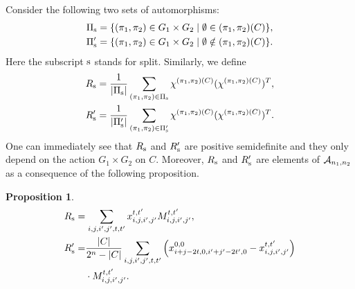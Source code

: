 \documentclass[final,onecolumn]{IEEEtran}
\newtheorem{propositionenv}[definitionenv]{Proposition}
\newenvironment{proposition}{\begin{propositionenv}\rm}{\end{propositionenv}}
\theoremstyle{definition}
\begin{document}
Consider the following two sets of automorphisms: 
\begin{align*}
	& \Pi_{\rm s} = \{(\pi_{1}, \pi_{2}) \in G_{1} \times G_{2} \mid \emptyset \in (\pi_{1}, \pi_{2})(C)\},\\
	& \Pi_{\rm s}' = \{(\pi_{1}, \pi_{2}) \in G_{1} \times G_{2} \mid \emptyset \notin (\pi_{1}, \pi_{2})(C)\}.
\end{align*}
Here the subscript $\rm s$ stands for split. Similarly, we define
\begin{align*}
	& R_{\rm s} = \frac{1}{\lvert \Pi_{\rm s} \rvert} \sum_{(\pi_{1}, \pi_{2}) \in \Pi_{\rm s}} \chi^{(\pi_{1}, \pi_{2})(C)} (\chi^{(\pi_{1}, \pi_{2})(C)})^{T}, \\
	& R_{\rm s}' = \frac{1}{\lvert \Pi_{\rm s}'\rvert}\sum_{(\pi_{1}, \pi_{2}) \in \Pi_{\rm s}'} \chi^{(\pi_{1}, \pi_{2})(C)} (\chi^{(\pi_{1}, \pi_{2})(C)})^{T}.
\end{align*}
One can immediately see that $R_{\rm s}$ and $R_{\rm s}'$ are positive semidefinite and they only depend on the action $G_{1} \times G_{2}$ on $C$. Moreover, $R_{\rm s}$ and $R_{\rm s}'$ are elements of ${\cal A}_{n_{1}, n_{2}}$ as a consequence of the following proposition.
\begin{proposition}
	\label{pro:R_R'}
	\begin{equation*}
		\begin{aligned}
			&R_{\rm s} = \sum_{i, j, i', j', t ,t'} x_{i, j, i', j'}^{t, t'}M_{i, j, i', j'}^{t, t'},\\
			& 
			\begin{aligned}
				R_{\rm s}' =& \frac{\lvert C \rvert}{2^{n}-\lvert C\rvert}\sum_{i, j, i', j', t ,t'} \left( x_{i+j-2t, 0, i'+j'-2t', 0}^{0, 0}-x_{i, j, i', j'}^{t, t'}\right) \\
				&\cdot M_{i, j, i', j'}^{t, t'}.
			\end{aligned}
		\end{aligned}
	\end{equation*}
\end{proposition}
	
\end{document}
